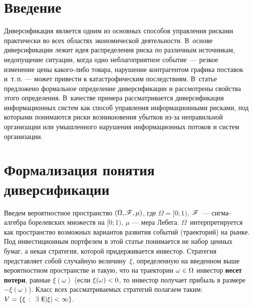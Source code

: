 

      \thispagestyle{headings}

      \begin{multicols}{2}
      
            \label{st\stat}

\section{Введение}

Диверсификация является одним из основных способов управления
рисками практически во всех областях экономической деятельности. 
В~основе диверсификации лежит идея распределения риска по различным
источникам, недопущение ситуации, когда одно неблагоприятное событие~--- 
резкое изменение цены какого-либо товара, нарушение контрагентом
графика поставок и~т.\,п. --- может привести к катастрофическим
последствиям. В~статье предложено формальное определение
диверсификации и рассмотрены свойства этого определения. В~качестве
примера рассматривается диверсификация информационных сис\-тем как
способ управления информационными рисками, под которыми понимаются
риски возникновения убытков из-за неправильной организации или
умышленного нарушения информационных потоков и сис\-тем организации.


\section{Формализация понятия диверсификации}

Введем вероятностное пространство $(\Omega,\mathscr{F},\mu)$, где
$\Omega=[0;1)$, $\mathscr{F}$~--- сиг\-ма-ал\-геб\-ра борелевских множеств на
$[0;1)$, $\mu$ --- мера Лебега. $\Omega$~интерпретируется как
пространство возможных вариантов развития событий (траекторий) на
рынке. Под инвестиционным портфелем в этой статье понимается не
набор ценных бумаг, а некая стратегия, которой придерживается
инвестор. Стратегия представляет собой случайную величину~$\xi$,
определенную на введенном выше вероятностном пространстве и такую,
что на траектории $\omega \hm\in \Omega$ инвестор \textbf{несет
потери}, равные $\xi(\omega)$ (если $\xi(\omega) \hm< 0 $, то инвестор
получает прибыль в размере $ - \xi(\omega)$). Класс всех
рассматриваемых стратегий полагаем таким: $V\hm=\Set{\xi}{\exists\
\Expect|\xi|< \infty}$.


\end{multicols}
